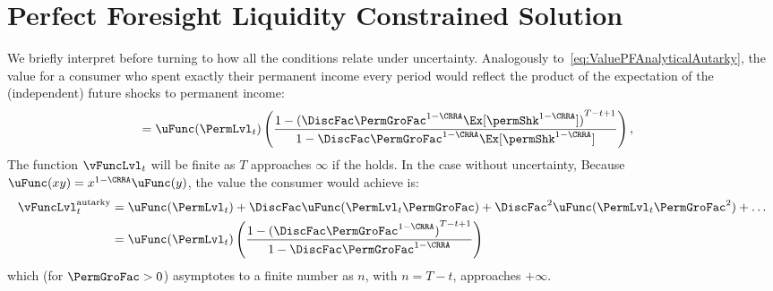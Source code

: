 \documentclass[\econtexRoot/BufferStockTheory]{subfiles}
\begin{document}
\let\TableWidth\relax
{\newlength\TableWidth}

\hypertarget{ApndxLiqConstr}{}
\section{Perfect Foresight Liquidity Constrained Solution}\label{sec:ApndxLiqConstr}

\hypertarget{Autarky-Value}{}
We briefly interpret {\FVAC} before turning to how all the conditions relate under uncertainty. Analogously to~\eqref{eq:ValuePFAnalyticalAutarky}, the value for a consumer who spent exactly their permanent income every period would reflect the product of the expectation of the (independent) future shocks to permanent income:\hypertarget{uInvEuPermShkDefn}{}
\begin{align*}
             & = \uFunc(\PermLvl_{t})\left(\frac{1-{(\DiscFac \PermGroFac^{1-\CRRA}\Ex[\permShk^{1-\CRRA}])}^{T-t+1}}{1-\DiscFac \PermGroFac^{1-\CRRA} \Ex[\permShk^{1-\CRRA}]}\right),
\end{align*}
%
The function $\vFuncLvl_{t}$ will be finite as $T$ approaches $\infty$ if the {\FVAC} holds. In the case without uncertainty, Because $\uFunc(xy) = x^{1-\CRRA}\uFunc(y)$, the value the consumer would achieve is: 
%
%
%
\begin{equation}\label{eq:ValuePFAnalyticalAutarky}\begin{gathered}\begin{aligned}  
      \vFuncLvl_{t}^{\text{autarky}}  & = \uFunc(\PermLvl_{t})+\DiscFac \uFunc(\PermLvl_{t}\PermGroFac)+\DiscFac^{2} \uFunc(\PermLvl_{t} \PermGroFac^{2})+\ldots
      \\  & = \uFunc(\PermLvl_{t})\left(\frac{1-{(\DiscFac \PermGroFac^{1-\CRRA})}^{T-t+1}}{1-\DiscFac \PermGroFac^{1-\CRRA}}\right) \notag
    \end{aligned}\end{gathered}\end{equation}
which (for $\PermGroFac>0$) asymptotes to a finite number as $n$, with $n=T-t$, approaches $+\infty$. 
\end{document}
